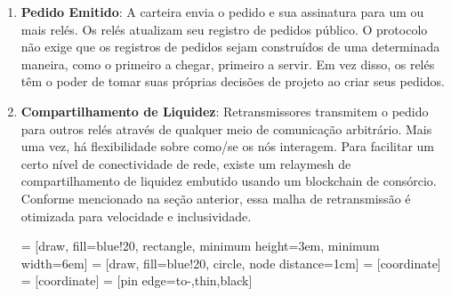 \documentclass[UTF8,nofonts]{article}
\makeatletter
\newenvironment{figurehere}
 {\def\@captype{figure}}
 {}
\makeatother
\begin{document}
\begin{multicols}{2}
\begin{enumerate}
\item \textbf{Pedido Emitido}: A carteira envia o pedido e sua assinatura para um ou mais relés. Os relés atualizam seu registro de pedidos público. O protocolo não exige que os registros de pedidos sejam construídos de uma determinada maneira, como o primeiro a chegar, primeiro a servir. Em vez disso, os relés têm o poder de tomar suas próprias decisões de projeto ao criar seus pedidos.

\item \textbf{Compartilhamento de Liquidez}: Retransmissores transmitem o pedido para outros relés através de qualquer meio de comunicação arbitrário. Mais uma vez, há flexibilidade sobre como/se os nós interagem. Para facilitar um certo nível de conectividade de rede, existe um relaymesh de compartilhamento de liquidez embutido usando um blockchain de consórcio. Conforme mencionado na seção anterior, essa malha de retransmissão é otimizada para velocidade e inclusividade.


\begin{center}
\begin{figurehere}
\centering
{} = [draw, fill=blue!20, rectangle, 
    minimum height=3em, minimum width=6em]
 = [draw, fill=blue!20, circle, node distance=1cm]
 = [coordinate]
 = [coordinate]
 = [pin edge={to-,thin,black}]

\end{figurehere}
\end{center}
\end{enumerate}
\end{multicols}
\end{document}
